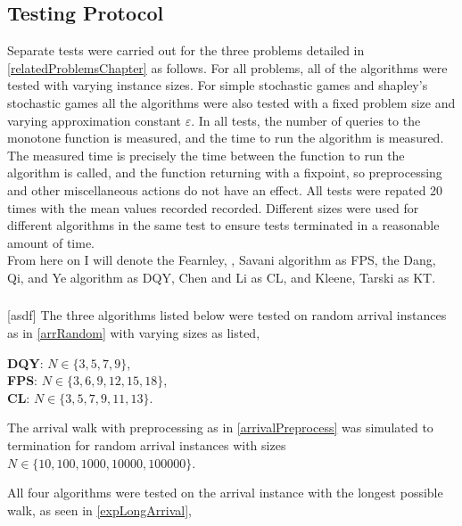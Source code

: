 \subsection{Testing Protocol}
Separate tests were carried out for the three problems detailed in \cref{relatedProblemsChapter} as follows.
For all problems, all of the algorithms were tested with varying instance sizes. For simple stochastic games
and shapley's stochastic games all the algorithms were also tested with a fixed problem size and varying
approximation constant $\varepsilon$. In all tests, the number of queries to the monotone function is
measured, and the time to run the algorithm is measured. The measured time is precisely the time between
the function to run the algorithm is called, and the function returning with a fixpoint, so preprocessing
and other miscellaneous actions do not have an effect. All tests were repated 20 times with the
mean values recorded recorded. Different sizes were used for different algorithms in the same test
to ensure tests terminated in a reasonable amount of time. \\
From here on I will denote the Fearnley, \pav, Savani algorithm as FPS, the Dang, Qi, and Ye algorithm as
DQY, Chen and Li as CL, and Kleene, Tarski as KT.
\subsubsection{\arr}
\begin{test} \label{arrMainTest}[asdf]
  The three algorithms listed below were tested on random arrival instances as in \cref{arrRandom}
  with varying sizes as listed, 
  \begin{itemize}
      \textbf{DQY}: $N \in \{3, 5, 7, 9\}$, \\
      \textbf{FPS}: $N \in \{3, 6, 9, 12, 15, 18\}$, \\
      \textbf{CL}: $N \in \{3, 5, 7, 9, 11, 13\}$.
  \end{itemize}
\end{test}
\begin{test} \label{arrWalkTest}
  The arrival walk with preprocessing as in \cref{arrivalPreprocess} 
  was simulated to termination for random arrival instances with sizes
  $N \in \{10, 100, 1000, 10000, 100000\}$.
\end{test}
\begin{test} \label{longArrivalTest}
  All four algorithms were tested on the arrival instance with the
  longest possible walk, as seen in \cref{expLongArrival},
\end{test}

